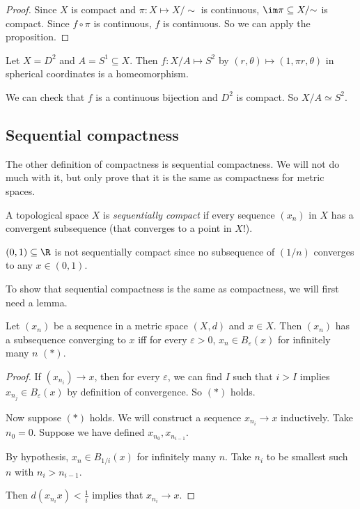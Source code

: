 \documentclass[a4paper]{article}
\begin{document}
\begin{proof}
  Since $X$ is compact and $\pi: X\mapsto X/{\sim}$ is continuous, $\im \pi \subseteq X/{\sim}$ is compact. Since $f\circ \pi$ is continuous, $f$ is continuous. So we can apply the proposition.
\end{proof}

\begin{eg}
  Let $X = D^2$ and $A = S^1 \subseteq X$. Then $f: X/A \mapsto S^2$ by $(r, \theta) \mapsto (1, \pi r, \theta)$ in spherical coordinates is a homeomorphism.

  We can check that $f$ is a continuous bijection and $D^2$ is compact. So $X/A \simeq S^2$.
\end{eg}

\subsection{Sequential compactness}
The other definition of compactness is sequential compactness. We will not do much with it, but only prove that it is the same as compactness for metric spaces.

\begin{defi}
  A topological space $X$ is \emph{sequentially compact} if every sequence $(x_n)$ in $X$ has a convergent subsequence (that converges to a point in $X$!).
\end{defi}

\begin{eg}
  $(0, 1) \subseteq \R$ is not sequentially compact since no subsequence of $(1/n)$ converges to any $x\in (0, 1)$.
\end{eg}

To show that sequential compactness is the same as compactness, we will first need a lemma.
\begin{lemma}
  Let $(x_n)$ be a sequence in a metric space $(X, d)$ and $x\in X$. Then $(x_n)$ has a subsequence converging to $x$ iff for every $\varepsilon > 0$, $x_n \in B_\varepsilon (x)$ for infinitely many $n$ $(*)$.
\end{lemma}

\begin{proof}
  If $(x_{n_i}) \to x$, then for every $\varepsilon$, we can find $I$ such that $i > I$ implies $x_{n_j}\in B_\varepsilon (x)$ by definition of convergence. So $(*)$ holds.

  Now suppose $(*)$ holds. We will construct a sequence $x_{n_i} \to x$ inductively. Take $n_0 = 0$. Suppose we have defined $x_{n_0}, x_{n_{i - 1}}$.

  By hypothesis, $x_n \in B_{1/i}(x)$ for infinitely many $n$. Take $n_i$ to be smallest such $n$ with $n_i > n_{i - 1}$.

  Then $d(x_{n_i} x) < \frac{1}{i}$ implies that $x_{n_i} \to x$.
\end{proof}
\end{document}
